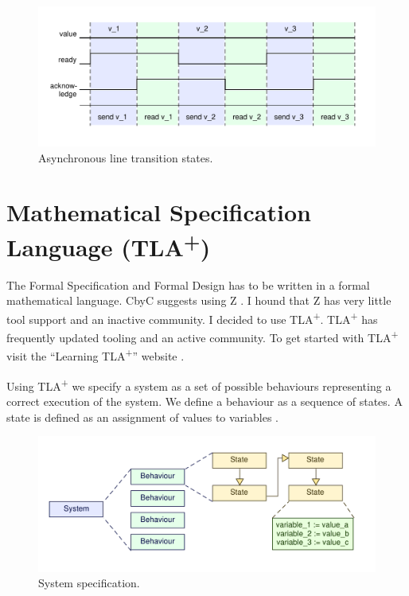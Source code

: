 \begin{figure}[H]
	\centering
	\includegraphics[scale=0.75]{Figures/AsyncInterface_send.pdf}
	\decoRule
	\caption{Asynchronous line transition states.}
	\label{fig:AsyncInterface_send}
\end{figure}

\section{Mathematical Specification Language (TLA\textsuperscript{+})}

The Formal Specification and Formal Design has to be written in a formal
mathematical language. CbyC suggests using Z  \parencite{CbyCPraxis}. 
I hound that Z has very little tool support and an inactive community. I decided
to use TLA\textsuperscript{+}.  TLA\textsuperscript{+} has frequently updated 
tooling and an active community. To get started with TLA\textsuperscript{+}
visit the ``Learning TLA\textsuperscript{+}'' website \parencite{LearningTLA}.

Using TLA\textsuperscript{+} we specify a system as a set of possible behaviours 
representing a correct execution of the system. We define a behaviour as a sequence
of states. A state is defined as an assignment of values to variables \parencite{SpecifyingSystems}.

\begin{figure}[H]
	\centering
	\includegraphics[scale=0.75]{Figures/System_Specification.pdf}
	\decoRule
	\caption{System specification.}
	\label{fig:SysSpec}
\end{figure}

